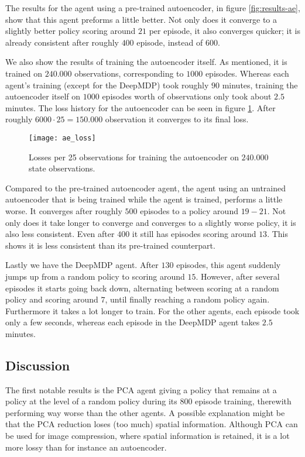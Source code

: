 The results for the agent using a pre-trained autoencoder, in figure \ref{fig:results-ae}, show that this agent preforms a little better. Not only does it converge to a slightly better policy scoring around $21$ per episode, it also converges quicker; it is already consistent after roughly $400$ episode, instead of $600$. 

We also show the results of training the autoencoder itself. As mentioned, it is trained on $240.000$ observations, corresponding to $1000$ episodes. Whereas each agent's training (except for the DeepMDP) took roughly $90$ minutes, training the autoencoder itself on $1000$ episodes worth of observations only took about $2.5$ minutes. The loss history for the autoencoder can be seen in figure \ref{fig:ae-loss}. After roughly $6000 \cdot 25 = 150.000$ observation it converges to its final loss.

\begin{figure}[h]
    \centering
    \texttt{[image: ae\_loss]}
    \caption{Losses per 25 observations for training the autoencoder on $240.000$ state observations.}
    \label{fig:ae-loss}
\end{figure}

Compared to the pre-trained autoencoder agent, the agent using an untrained autoencoder that is being trained while the agent is trained, performs a little worse. It converges after roughly $500$ episodes to a policy around $19-21$. Not only does it take longer to converge and converges to a slightly worse policy, it is also less consistent. Even after $400$ it still has episodes scoring around $13$. This shows it is less consistent than its pre-trained counterpart.

Lastly we have the DeepMDP agent. After $130$ episodes, this agent suddenly jumps up from a random policy to scoring around $15$. However, after several episodes it starts going back down, alternating between scoring at a random policy and scoring around $7$, until finally reaching a random policy again. Furthermore it takes a lot longer to train. For the other agents, each episode took only a few seconds, whereas each episode in the DeepMDP agent takes $2.5$ minutes.

\subsection{Discussion}\label{research-discussion}
The first notable results is the PCA agent giving a policy that remains at a policy at the level of a random policy during its $800$ episode training, therewith performing way worse than the other agents. A possible explanation might be that the PCA reduction loses (too much) spatial information. Although PCA can be used for image compression, where spatial information is retained, it is a lot more lossy than for instance an autoencoder.

